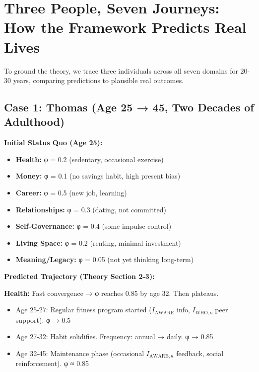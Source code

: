 {{%

\section{Three People, Seven Journeys: How the Framework Predicts Real Lives}
\label{sec:case-studies}

To ground the theory, we trace three individuals across all seven domains for 20-30 years, comparing predictions to plausible real outcomes.

\subsection{Case 1: Thomas (Age 25 → 45, Two Decades of Adulthood)}

\textbf{Initial Status Quo (Age 25):}
\begin{itemize}[nosep]
\item \textbf{Health:} φ = 0.2 (sedentary, occasional exercise)
\item \textbf{Money:} φ = 0.1 (no savings habit, high present bias)
\item \textbf{Career:} φ = 0.5 (new job, learning)
\item \textbf{Relationships:} φ = 0.3 (dating, not committed)
\item \textbf{Self-Governance:} φ = 0.4 (some impulse control)
\item \textbf{Living Space:} φ = 0.2 (renting, minimal investment)
\item \textbf{Meaning/Legacy:} φ = 0.05 (not yet thinking long-term)
\end{itemize}

\textbf{Predicted Trajectory (Theory Section 2-3):}

\textbf{Health:} Fast convergence → φ reaches 0.85 by age 32. Then plateaus.
\begin{itemize}[nosep]
\item Age 25-27: Regular fitness program started ($I_{\text{AWARE}}$ info, $I_{\text{WHO},o}$ peer support). φ → 0.5
\item Age 27-32: Habit solidifies. Frequency: annual → daily. φ → 0.85
\item Age 32-45: Maintenance phase (occasional $I_{\text{AWARE},\kappa}$ feedback, social reinforcement). φ ≈ 0.85
\end{itemize}

}}
